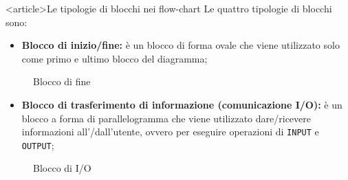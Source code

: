 \documentclass[
    notheorems,
    11pt,
    compress,
    aspectratio=169
]{beamer}
\begin{document}
\begin{frame}<article>{Le tipologie di blocchi nei flow-chart}
    Le quattro tipologie di blocchi sono:

    \begin{itemize}
        \item \textbf{Blocco di inizio/fine:} è un blocco di forma ovale che viene utilizzato solo come primo e ultimo blocco del diagramma;
    \end{itemize}

    \begin{figure}[htbp]
        \centering
    
        \begin{minipage}{0.45\textwidth}
            \centering
            \caption{Blocco di inizio}
            \label{fig:11}
        \end{minipage}\hfill
        \begin{minipage}{0.45\textwidth}
            \centering
            \caption{Blocco di fine}
            \label{fig:12}
        \end{minipage}
    \end{figure}

    \begin{itemize}
        \item \textbf{Blocco di trasferimento di informazione (comunicazione I/O):} è un blocco a forma di parallelogramma che viene utilizzato dare/ricevere informazioni all'/dall'utente, ovvero per eseguire operazioni di \verb|INPUT| e \verb|OUTPUT|;
    \end{itemize}

    \begin{figure}[htbp]
        \centering

        
        \caption{Blocco di I/O}
        \label{fig:13}
    \end{figure}


\end{frame}
\end{document}
